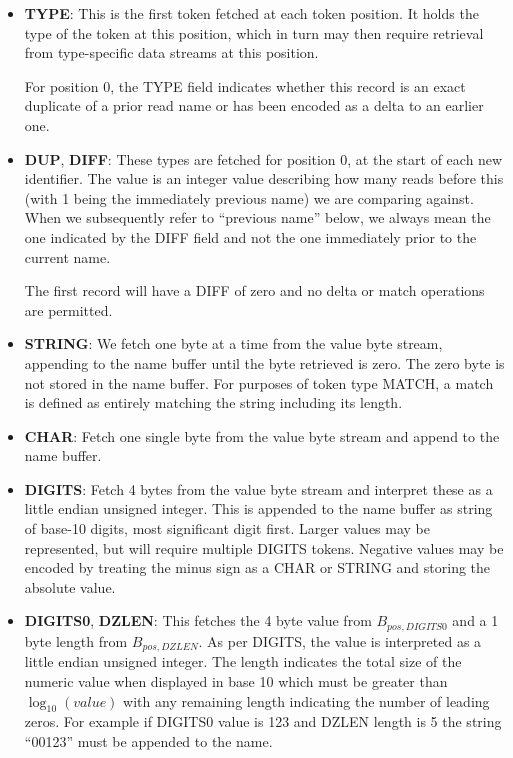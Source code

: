 \documentclass[a4paper]{article}
\begin{document}
\begin{itemize}
\item{\textbf{TYPE}:}
This is the first token fetched at each token position.  It holds the
type of the token at this position, which in turn may then require
retrieval from type-specific data streams at this position.

For position 0, the TYPE field indicates whether this record is an
exact duplicate of a prior read name or has been encoded as a delta to
an earlier one.

\item{\textbf{DUP}, \textbf{DIFF}:}
These types are fetched for position 0, at the start of each new
identifier.  The value is an integer value describing how many reads
before this (with 1 being the immediately previous name) we are
comparing against.  When we subsequently refer to ``previous name'' below, we
always mean the one indicated by the DIFF field and not the one
immediately prior to the current name.

The first record will have a DIFF of zero and no delta or match
operations are permitted.

\item{\textbf{STRING}:}
We fetch one byte at a time from the value byte stream, appending to the
name buffer until the byte retrieved is zero.  The zero byte is not
stored in the name buffer.
For purposes of token type MATCH, a match is defined as entirely
matching the string including its length.

\item{\textbf{CHAR}:}
Fetch one single byte from the value byte stream and append to the name buffer.

\item{\textbf{DIGITS}:}
Fetch 4 bytes from the value byte stream and interpret these as a little
endian unsigned integer.  This is appended to the name buffer as
string of base-10 digits, most significant digit first.  Larger
values may be represented, but will require multiple DIGITS tokens.
Negative values may be encoded by treating the minus sign as a CHAR or
STRING and storing the absolute value.

\item{\textbf{DIGITS0}, \textbf{DZLEN}:}
This fetches the 4 byte value from $B_{pos,DIGITS0}$ and a 1 byte
length from $B_{pos,DZLEN}$.  As per DIGITS, the value is interpreted as a
little endian unsigned integer.  The length indicates the total
size of the numeric value when displayed in base 10 which must be
greater than $\log_{10}(value)$ with any remaining length indicating
the number of leading zeros.  For example if DIGITS0 value is 123 and
DZLEN length is 5 the string ``00123'' must be appended to the name.


\end{itemize}
\end{document}
